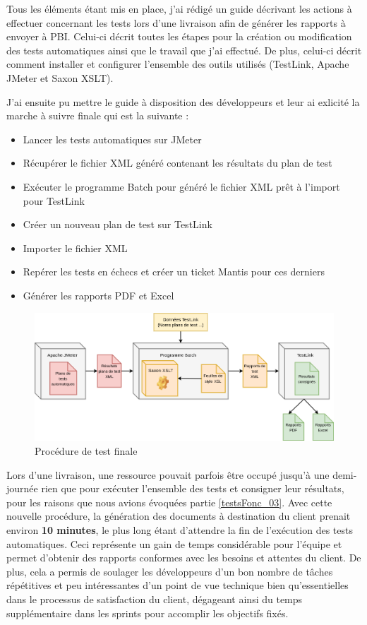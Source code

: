 	Tous les éléments étant mis en place, j'ai rédigé un guide décrivant les actions à effectuer concernant les tests lors d'une livraison afin de générer les rapports à envoyer à PBI. Celui-ci décrit toutes les étapes pour la création ou modification des tests automatiques ainsi que le travail que j'ai effectué. De plus, celui-ci décrit comment installer et configurer l'ensemble des outils utilisés (TestLink, Apache JMeter et Saxon XSLT).
	
J'ai ensuite pu mettre le guide à disposition des développeurs et leur ai exlicité la marche à suivre finale qui est la suivante :
	\begin{itemize}
		\item Lancer les tests automatiques sur JMeter
		\item Récupérer le fichier XML généré contenant les résultats du plan de test
		\item Exécuter le programme Batch pour généré le fichier XML prêt à l'import pour TestLink
		\item Créer un nouveau plan de test sur TestLink
		\item Importer le fichier XML
		\item Repérer les tests en échecs et créer un ticket Mantis pour ces derniers
		\item Générer les rapports PDF et Excel \\
	\end{itemize}

\begin{figure}[h!]
	\includegraphics[scale=0.5]{images/travailNeuflizeOBC/testsFonc/testsProcedure.png}
	\centering
	\caption{Procédure de test finale}
	\label{testsProcedure}
\end{figure}

	Lors d'une livraison, une ressource pouvait parfois être occupé jusqu'à une demi-journée rien que pour exécuter l'ensemble des tests et consigner leur résultats, pour les raisons que nous avions évoquées partie \ref{testsFonc_03}. Avec cette nouvelle procédure, la génération des documents à destination du client prenait environ \textbf{10 minutes}, le plus long étant d'attendre la fin de l'exécution des tests automatiques. Ceci représente un gain de temps considérable pour l'équipe et permet d'obtenir des rapports conformes avec les besoins et attentes du client. De plus, cela a permis de soulager les développeurs d'un bon nombre de tâches répétitives et peu intéressantes d'un point de vue technique bien qu'essentielles dans le processus de satisfaction du client, dégageant ainsi du temps supplémentaire dans les sprints pour accomplir les objectifs fixés. \\
	
